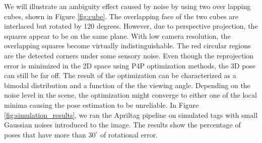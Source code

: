 We will illustrate an ambiguity effect caused by noise by using two over lapping cubes, shown in Figure \ref{fig:cube}. The overlapping face of the two cubes are interlaced but rotated by 120 degrees. However, due to perspective projection, the squares appear to be on the same plane. With low camera resolution, the overlapping squares become virtually indistinguishable. The red circular regions are the detected corners under some sensory noise. Even though the reprojection error is minimized in the 2D space using P4P optimization methods, the 3D pose can still be far off. The result of the optimization can be characterized as a bimodal distribution and a function of the the viewing angle. Depending on the noise level in the scene, the optimization might converge to either one of the local minima causing the pose estimation to be unreliable. In Figure \ref{fig:simulation_results}, we ran the Apriltag pipeline on simulated tags with small Gaussian noises introduced to the image. The results show the percentage of poses that have more than $30^{\circ}$ of rotational error.